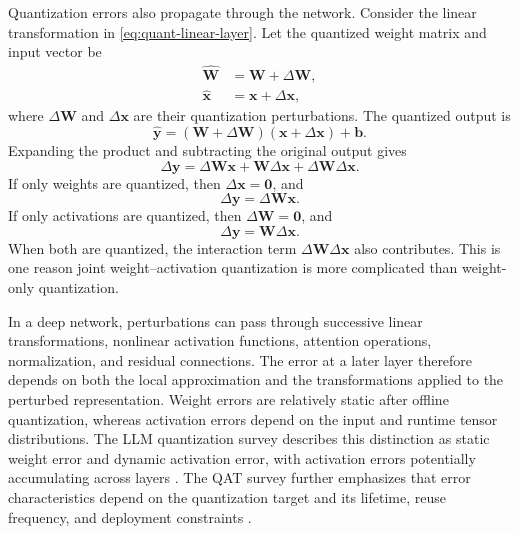 Quantization errors also propagate through the network. Consider the
linear transformation in \cref{eq:quant-linear-layer}. Let the
quantized weight matrix and input vector be
\begin{align}
    \widehat{\mathbf{W}}
    &=\mathbf{W}+\Delta\mathbf{W},
    \label{eq:quant-weight-perturbation}
    \\
    \widehat{\mathbf{x}}
    &=\mathbf{x}+\Delta\mathbf{x},
    \label{eq:quant-activation-perturbation}
\end{align}
where \(\Delta\mathbf{W}\) and \(\Delta\mathbf{x}\) are their
quantization perturbations. The quantized output is
\begin{equation}
    \widehat{\mathbf{y}}
    =
    (\mathbf{W}+\Delta\mathbf{W})
    (\mathbf{x}+\Delta\mathbf{x})+\mathbf{b}.
    \label{eq:quant-perturbed-output}
\end{equation}
Expanding the product and subtracting the original output gives
\begin{equation}
    \boxed{
    \Delta\mathbf{y}
    =
    \Delta\mathbf{W}\mathbf{x}
    +\mathbf{W}\Delta\mathbf{x}
    +\Delta\mathbf{W}\Delta\mathbf{x}.
    }
    \label{eq:quant-output-error}
\end{equation}
If only weights are quantized, then
\(\Delta\mathbf{x}=\mathbf{0}\), and
\begin{equation}
    \Delta\mathbf{y}
    =
    \Delta\mathbf{W}\mathbf{x}.
    \label{eq:quant-weight-only-error}
\end{equation}
If only activations are quantized, then
\(\Delta\mathbf{W}=\mathbf{0}\), and
\begin{equation}
    \Delta\mathbf{y}
    =
    \mathbf{W}\Delta\mathbf{x}.
    \label{eq:quant-activation-only-error}
\end{equation}
When both are quantized, the interaction term
\(\Delta\mathbf{W}\Delta\mathbf{x}\) also contributes. This is one
reason joint weight--activation quantization is more complicated than
weight-only quantization.

In a deep network, perturbations can pass through successive linear
transformations, nonlinear activation functions, attention operations,
normalization, and residual connections. The error at a later layer
therefore depends on both the local approximation and the transformations
applied to the perturbed representation. Weight errors are relatively
static after offline quantization, whereas activation errors depend on
the input and runtime tensor distributions. The LLM quantization survey
describes this distinction as static weight error and dynamic activation
error, with activation errors potentially accumulating across layers
\parencite{chen2026llmquantization}. The QAT survey further emphasizes
that error characteristics depend on the quantization target and its
lifetime, reuse frequency, and deployment constraints
\parencite{song2026targetcentricqat}.

